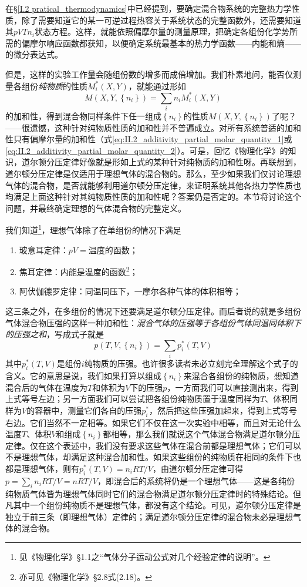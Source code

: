 \documentclass[main.tex]{subfiles}
\begin{document}
在\S\ref{I.2 pratical_thermodynamics}中已经提到，要确定混合物系统的完整热力学性质，除了需要知道它的某一可逆过程热容关于系统状态的完整函数外，还需要知道其$pVTn_i$状态方程。这样，就能依照偏摩尔量的测量原理，把确定各组份化学势所需的偏摩尔响应函数都获知，以便确定系统最基本的热力学函数——内能和熵——的微分表达式。

但是，这样的实验工作量会随组份数的增多而成倍增加。我们朴素地问，能否仅测量各组份\emph{纯物质}的性质$M_i^*\left(X,Y\right)$，就能通过形如
\[M\left(X,Y,\left\{n_i\right\}\right)=\sum_i n_i M_i^*\left(X,Y\right)\]
的加和性，得到混合物同样条件下任一组成$\left\{n_i\right\}$的性质$M\left(X,Y,\left\{n_i\right\}\right)$了呢？——很遗憾，这种针对纯物质性质的加和性并不普遍成立。对所有系统普适的加和性只有偏摩尔量的加和性（式\eqref{eq:II.2_additivity_partial_molar_quantity_1}或\eqref{eq:II.2_additivity_partial_molar_quantity_2}）。可是，回忆《物理化学》的知识，道尔顿分压定律好像就是形如上式的某种针对纯物质的加和性呀。再联想到，道尔顿分压定律是仅适用于理想气体的混合物的。那么，至少如果我们仅讨论理想气体的混合物，是否就能够利用道尔顿分压定律，来证明系统其他各热力学性质也均满足上面这种针对其纯物质性质的加和性呢？答案仍是否定的。本节将讨论这个问题，并最终确定理想的气体混合物的完整定义。

我们知道\footnote{见《物理化学》\S1.1之“气体分子运动公式对几个经验定律的说明”。}，理想气体除了在单组份的情况下满足
\begin{enumerate}
  \item 玻意耳定律：$pV=\text{温度的函数}$；
  \item 焦耳定律：内能是温度的函数\footnote{亦可见《物理化学》\S 2.8式(2.18)。}；
  \item 阿伏伽德罗定律：同温同压下，一摩尔各种气体的体积相等；
\end{enumerate}
这三条之外，在多组份的情况下还要满足道尔顿分压定律。而后者说的就是多组份气体混合物压强的这样一种加和性：\emph{混合气体的压强等于各组份气体同温同体积下的压强之和}，写成式子就是
\[p\left(T,V,\left\{n_i\right\}\right)=\sum_i p^*_i\left(T,V\right)\]
其中$p_i^*\left(T,V\right)$是组份$i$纯物质的压强。也许很多读者未必立刻完全理解这个式子的含义。它的意思是说，我们如果打算以组成$\left\{n_i\right\}$来混合各组份的纯物质，想知道混合后的气体在温度为$T$和体积为$V$下的压强$p$，一方面我们可以直接测出来，得到上式等号左边；另一方面我们可以尝试把各组份纯物质置于温度同样为$T$、体积同样为$V$的容器中，测量它们各自的压强$p_i^*$，然后把这些压强加起来，得到上式等号右边。它们当然不一定相等。如果它们不仅在这一次实验中相等，而且对无论什么温度$T$、体积$V$和组成$\left\{n_i\right\}$都相等，那么我们就说这个气体混合物满足道尔顿分压定律。仅在这个表述中，我们没有要求这些气体在混合前都是理想气体；它们可以不是理想气体，却满足这种混合加和性。如果这些组份的纯物质在相同的条件下也都是理想气体，则有$p_i^*\left(T,V\right)=n_iRT/V$，由道尔顿分压定律可得$p=\sum_in_iRT/V=nRT/V$，即混合后的系统将仍是一个理想气体——这是各纯份纯物质气体皆为理想气体同时它们的混合物满足道尔顿分压定律时的特殊结论。但凡其中一个组份纯物质不是理想气体，都没有这个结论。可见，道尔顿分压定律是独立于前三条（即理想气体）定律的；满足道尔顿分压定律的混合物未必是理想气体的混合物。
\end{document}
